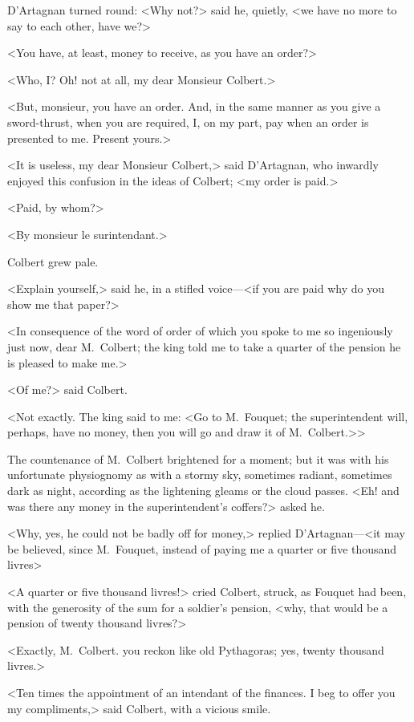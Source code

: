 D'Artagnan turned round: <Why not?> said he, quietly, <we have no more to say to each other, have we?>

<You have, at least, money to receive, as you have an order?>

<Who, I\@? Oh! not at all, my dear Monsieur Colbert.>

<But, monsieur, you have an order. And, in the same manner as you give a sword-thrust, when you are required, I, on my part, pay when an order is presented to me. Present yours.>

<It is useless, my dear Monsieur Colbert,> said D'Artagnan, who inwardly enjoyed this confusion in the ideas of Colbert; <my order is paid.>

<Paid, by whom?>

<By monsieur le surintendant.>

Colbert grew pale.

<Explain yourself,> said he, in a stifled voice—<if you are paid why do you show me that paper?>

<In consequence of the word of order of which you spoke to me so ingeniously just now, dear M.~Colbert; the king told me to take a quarter of the pension he is pleased to make me.>

<Of me?> said Colbert.

<Not exactly. The king said to me: <Go to M.~Fouquet; the superintendent will, perhaps, have no money, then you will go and draw it of M.~Colbert.>>

The countenance of M.~Colbert brightened for a moment; but it was with his unfortunate physiognomy as with a stormy sky, sometimes radiant, sometimes dark as night, according as the lightening gleams or the cloud passes. <Eh! and was there any money in the superintendent's coffers?> asked he.

<Why, yes, he could not be badly off for money,> replied D'Artagnan—<it may be believed, since M.~Fouquet, instead of paying me a quarter or five thousand livres\longdash>

<A quarter or five thousand livres!> cried Colbert, struck, as Fouquet had been, with the generosity of the sum for a soldier's pension, <why, that would be a pension of twenty thousand livres?>

<Exactly, M.~Colbert.  you reckon like old Pythagoras; yes, twenty thousand livres.>

<Ten times the appointment of an intendant of the finances. I beg to offer you my compliments,> said Colbert, with a vicious smile.

